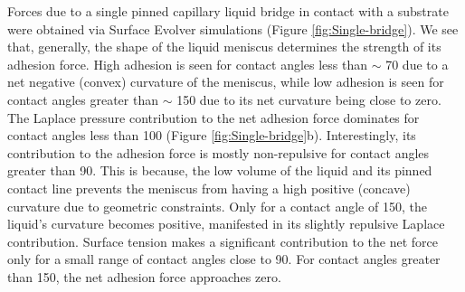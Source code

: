 \documentclass[vruler,JEB]{COB}%
\begin{document}
Forces due to a single pinned capillary liquid bridge in contact with
a substrate were obtained via Surface Evolver simulations (Figure \ref{fig:Single-bridge}).
We see that, generally, the shape of the liquid meniscus determines
the strength of its adhesion force. High adhesion is seen for contact
angles less than $\sim$ 70\textdegree{} due to a net negative (convex) curvature
of the meniscus, while low adhesion is seen for contact angles greater
than $\sim$ 150\textdegree{} due to its net curvature being close
to zero. The Laplace pressure contribution to the net adhesion force
dominates for contact angles less than 100\textdegree{} (Figure \ref{fig:Single-bridge}b).
Interestingly, its contribution to the adhesion force is mostly non-repulsive
for contact angles greater than 90\textdegree . This is because, the
low volume of the liquid and its pinned contact line prevents the
meniscus from having a high positive (concave) curvature due to geometric constraints.
Only for a contact angle of 150\textdegree , the liquid's curvature
becomes positive, manifested in its slightly repulsive Laplace contribution.
Surface tension makes a significant contribution to the net force
only for a small range of contact angles close to 90\textdegree .
For contact angles greater than 150\textdegree , the net adhesion
force approaches zero.
\end{document}
